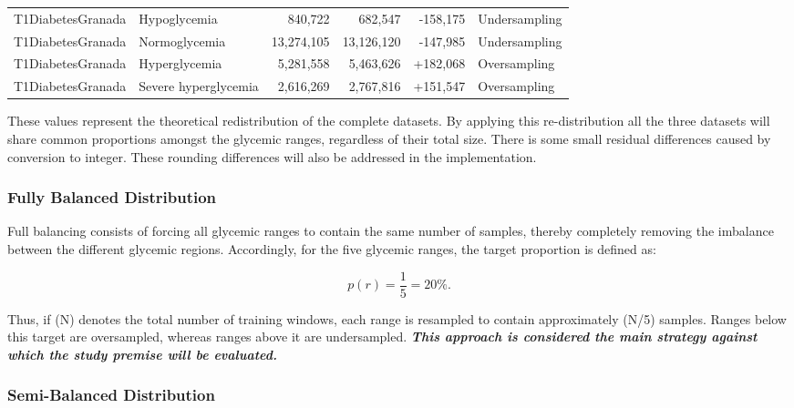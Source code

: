 \begin{table}[htbp]
{\begin{tabular}{llrrrl}
        T1DiabetesGranada
        & Hypoglycemia
        & 840,722 & 682,547 & -158,175 & Undersampling \\

        T1DiabetesGranada
        & Normoglycemia
        & 13,274,105 & 13,126,120 & -147,985 & Undersampling \\

        T1DiabetesGranada
        & Hyperglycemia
        & 5,281,558 & 5,463,626 & +182,068 & Oversampling \\

        T1DiabetesGranada
        & Severe hyperglycemia
        & 2,616,269 & 2,767,816 & +151,547 & Oversampling \\
        \hline
    \end{tabular}%
    }
\end{table}

These values represent the theoretical redistribution of the complete datasets. By applying this re-distribution all the three datasets will share common proportions amongst the glycemic ranges, regardless of their total size. There is some small residual differences caused by conversion to integer. These rounding differences will also be addressed in the implementation. 

\subsubsection{Fully Balanced Distribution}
\label{subsubsec:full_balancing_distribution}

Full balancing consists of forcing all glycemic ranges to contain the same number of samples, thereby completely removing the imbalance between the different glycemic regions. Accordingly, for the five glycemic ranges, the target proportion is defined as:

\[
p(r)=\frac{1}{5}=20\%.
\]

Thus, if (N) denotes the total number of training windows, each range is resampled to contain approximately (N/5) samples. Ranges below this target are oversampled, whereas ranges above it are undersampled. \textbf{\textit{This approach is considered the main strategy against which the study premise will be evaluated.}}

\subsubsection{Semi-Balanced Distribution}
\label{subsubsec:semi_balancing_distribution}

